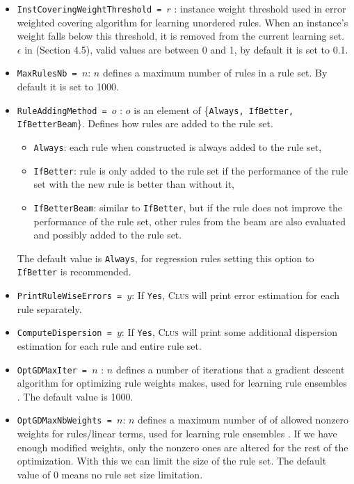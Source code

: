 \documentclass[a4paper]{report}
\newcommand{\clus}{\textsc{Clus}}
\begin{document}
\begin{itemize}
	\item \texttt{InstCoveringWeightThreshold = $r$} : instance weight threshold used in error weighted covering algorithm for learning unordered rules. When an instance's weight falls below this threshold, it is removed from the current learning set.  $\epsilon$ in \cite{Zenko07} (Section 4.5), valid values are between 0 and 1, by default it is set to 0.1.
	\item \texttt{MaxRulesNb = $n$}: $n$ defines a maximum number of rules in a rule set. By default it is set to 1000.
	\item \texttt{RuleAddingMethod = $o$} : $o$ is an element of \{\texttt{Always, IfBetter, IfBetterBeam}\}. Defines how rules are added to the rule set.
	\begin{itemize}
		\item \texttt{Always}: each rule when constructed is always added to the rule set,
		\item \texttt{IfBetter}: rule is only added to the rule set if the performance of the rule set with the new rule is better than without it,
		\item \texttt{IfBetterBeam}: similar to \texttt{IfBetter}, but if the rule does not improve the performance of the rule set, other rules from the beam are also evaluated and possibly added to the rule set.
	\end{itemize}
	The default value is \texttt{Always}, for regression rules setting this option to \texttt{IfBetter} is recommended.
	\item \texttt{PrintRuleWiseErrors = $y$}: If \texttt{Yes},  \clus{} will print error estimation for each rule separately.
	\item {\tt ComputeDispersion = $y$}: If \texttt{Yes},  \clus{} will print some additional dispersion estimation for each rule and entire rule set.
	\item \texttt{OptGDMaxIter = $n$} : $n$ defines a number of iterations that a gradient descent algorithm for
optimizing rule weights makes, used for learning rule ensembles \cite{Aho2009}. The default value is 1000.
	\item \texttt{OptGDMaxNbWeights = $n$}: $n$ defines a maximum number of of allowed nonzero weights for
rules/linear terms, used for learning rule ensembles \cite{Aho2009}. If we have enough modified weights, only the nonzero ones are altered for the rest of the optimization. With this we can limit the size of the rule set. The default value of 0 means no rule set size limitation.

\end{itemize}
\end{document}
